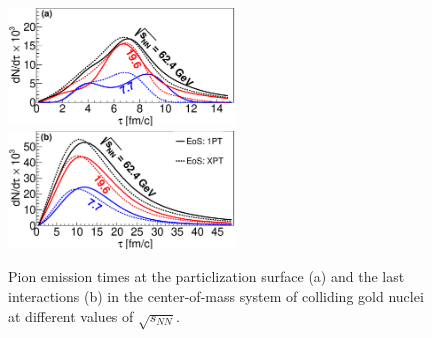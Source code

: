 \documentclass[a4paper]{panl}
\begin{document}
\begin{figure}[t]
\begin{center}
  \includegraphics[width=60mm]{fig1b.eps}
  \includegraphics[width=60mm]{fig1a.eps}
\vspace{-3mm}
\caption{Pion emission times at the particlization surface (a) and the last interactions (b) in the center-of-mass system of colliding gold nuclei at different values of $\sqrt{s_{NN}}$.}
\end{center}
\vspace{-5mm}
\end{figure}

\label{sec:Results_and_discussion}
\end{document}
